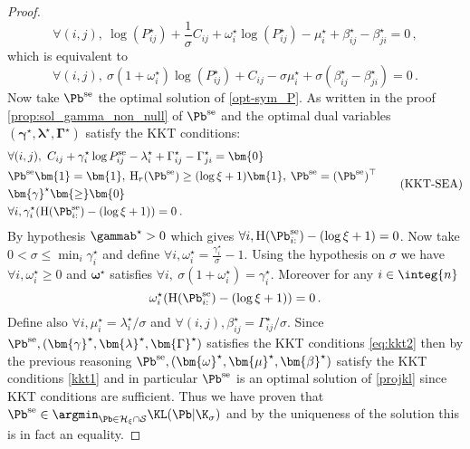 \begin{proof}
\begin{equation}
\forall (i,j), \ \log(P^\star_{ij}) + \frac{1}{\sigma} C_{ij}+ \omega_i^\star \log(P^\star_{ij}) -\mu^\star_i+\beta_{ij}^\star-\beta_{ji}^\star = 0\,,
\end{equation}
which is equivalent to 
\begin{equation}
\forall (i,j), \ \sigma(1+\omega_i^\star)\log(P^\star_{ij}) + C_{ij} -\sigma \mu^\star_i+\sigma(\beta_{ij}^\star-\beta_{ji}^\star) = 0\,.
\end{equation}
Now take $\Pb^{\mathrm{se}}$ the optimal solution of \eqref{opt-sym_P}. As written in the proof \cref{prop:sol_gamma_non_null} of  $\Pb^{\mathrm{se}}$ and the optimal dual variables $(\bm{\gamma}^\star, \bm{\lambda}^\star, \bm{\Gamma}^\star)$ satisfy the KKT conditions:
\begin{equation}
\label{eq:kkt2}
    \begin{aligned}
    &\forall (i,j), \ C_{ij} + \gamma_i^\star\log{P^{\mathrm{se}}_{ij}} - \lambda_i^\star + \Gamma^\star_{ij}-\Gamma^\star_{ji} = \bm{0} \\
    &\Pb^{\mathrm{se}} \bm{1} = \bm{1}, \: \operatorname{H}_r(\Pb^{\mathrm{se}}) \geq (\log{\xi} + 1)\bm{1}, \: \Pb^{\mathrm{se}} = (\Pb^{\mathrm{se}})^\top \\
    &\bm{\gamma}^\star \bm{\geq} \bm{0} \\
    &\forall i, \gamma_i^\star (\operatorname{H}(\Pb^{\mathrm{se}}_{i:}) - (\log{\xi} + 1)) = 0\:.
\end{aligned}
\tag{KKT-SEA}
\end{equation}
By hypothesis $\gammab^\star > 0$ which gives $\forall i, \operatorname{H}(\Pb^{\mathrm{se}}_{i:}) - (\log{\xi} + 1) = 0$. Now take $0 < \sigma \leq \min_i \gamma^\star_i$ and define $\forall i, \omega_i^\star = \frac{\gamma_i^\star}{\sigma} -1$. Using the hypothesis on $\sigma$ we have $\forall i, \omega_i^\star \geq 0$ and $\bm{\omega}^\star$ satisfies $\forall i, \ \sigma(1+\omega^\star_i) = \gamma_{i}^\star$. Moreover for any $i \in \integ{n}$
\begin{equation}
\omega_i^\star(\operatorname{H}(\Pb^{\mathrm{se}}_{i:}) - (\log{\xi} + 1)) = 0 \,.
\end{equation}
Define also $\forall i, \mu_i^\star = \lambda_i^\star/\sigma$ and $\forall (i,j), \beta_{ij}^\star = \Gamma_{ij}^\star/\sigma$. Since $\Pb^{\mathrm{se}}, (\bm{\gamma}^\star, \bm{\lambda}^\star, \bm{\Gamma}^\star)$ satisfies the KKT conditions \eqref{eq:kkt2} then by the previous reasoning $\Pb^{\mathrm{se}}, (\bm{\omega}^\star, \bm{\mu}^\star, \bm{\beta}^\star)$ satisfy the KKT conditions \eqref{kkt1} and in particular $\Pb^{\mathrm{se}}$ is an optimal solution of \eqref{projkl} since KKT conditions are sufficient. Thus we have proven that $\Pb^{\mathrm{se}} \in \argmin_{\Pb \in \mathcal{H}_{\xi} \cap \mathcal{S}} \KL(\Pb | \K_\sigma)$ and by the uniqueness of the solution this is in fact an equality.
\end{proof}

